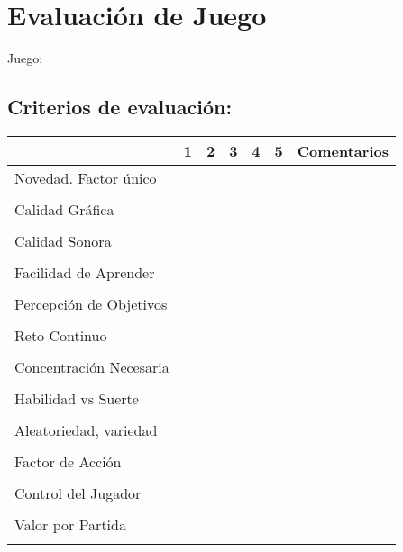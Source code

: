 \documentclass[12pt,a4paper]{article}
\begin{document}
\section*{Evaluación de Juego}

\begin{center}
  \huge{Juego:
  }
\end{center}
\subsection*{Criterios de evaluación: }

\begin{tabular}{|l|c|c|c|c|c|p{7cm}| }
  \hline
   & 1 & 2 & 3 & 4 & 5 & Comentarios \\
  \hline
  \hline
  Novedad. Factor único & & & & & & \\
   & & & & & & \\
  \hline
  Calidad Gráfica & & & & & & \\
   & & & & & & \\
  \hline
  Calidad Sonora & & & & & & \\
   & & & & & & \\
  \hline
  Facilidad de Aprender & & & & & & \\
   & & & & & & \\
  \hline
  Percepción de Objetivos & & & & & & \\
   & & & & & & \\
  \hline
  Reto Continuo  & & & & & & \\
   & & & & & & \\
  \hline
  Concentración Necesaria & & & & & & \\
   & & & & & & \\
  \hline
  Habilidad vs Suerte & & & & & & \\
   & & & & & & \\
  \hline
  Aleatoriedad, variedad & & & & & & \\
   & & & & & & \\
  \hline
  Factor de Acción & & & & & & \\
   & & & & & & \\
  \hline
  Control del Jugador & & & & & & \\
   & & & & & & \\
  \hline
  Valor por Partida & & & & & & \\
   & & & & & & \\
  \hline
\end{tabular}
\end{document}
